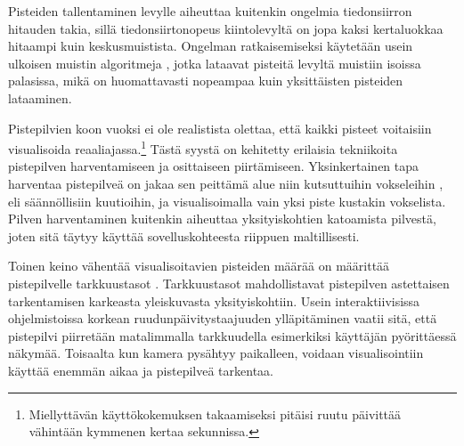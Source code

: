 Pisteiden tallentaminen levylle aiheuttaa kuitenkin ongelmia tiedonsiirron hitauden takia, sillä tiedonsiirtonopeus kiintolevyltä on jopa kaksi kertaluokkaa hitaampi kuin keskusmuistista. Ongelman ratkaisemiseksi käytetään usein ulkoisen muistin algoritmeja , jotka lataavat pisteitä levyltä muistiin isoissa palasissa, mikä on huomattavasti nopeampaa kuin yksittäisten pisteiden lataaminen. \cite{scheiblauer} 

Pistepilvien koon vuoksi ei ole realistista olettaa, että kaikki pisteet voitaisiin visualisoida reaaliajassa.\footnote{Miellyttävän käyttökokemuksen takaamiseksi pitäisi ruutu päivittää vähintään kymmenen kertaa sekunnissa.} Tästä syystä on kehitetty erilaisia tekniikoita pistepilven harventamiseen ja osittaiseen piirtämiseen. Yksinkertainen tapa harventaa pistepilveä on jakaa sen peittämä alue niin kutsuttuihin vokseleihin , eli säännöllisiin kuutioihin, ja visualisoimalla vain yksi piste kustakin vokselista. Pilven harventaminen kuitenkin aiheuttaa yksityiskohtien katoamista pilvestä, joten sitä täytyy käyttää sovelluskohteesta riippuen maltillisesti. 

Toinen keino vähentää visualisoitavien pisteiden määrää on määrittää pistepilvelle tarkkuustasot . Tarkkuustasot mahdollistavat pistepilven astettaisen tarkentamisen karkeasta yleiskuvasta yksityiskohtiin. Usein interaktiivisissa ohjelmistoissa korkean ruudunpäivitystaajuuden ylläpitäminen vaatii sitä, että pistepilvi piirretään matalimmalla tarkkuudella esimerkiksi käyttäjän pyörittäessä näkymää. Toisaalta kun kamera pysähtyy paikalleen, voidaan visualisointiin käyttää enemmän aikaa ja pistepilveä tarkentaa.